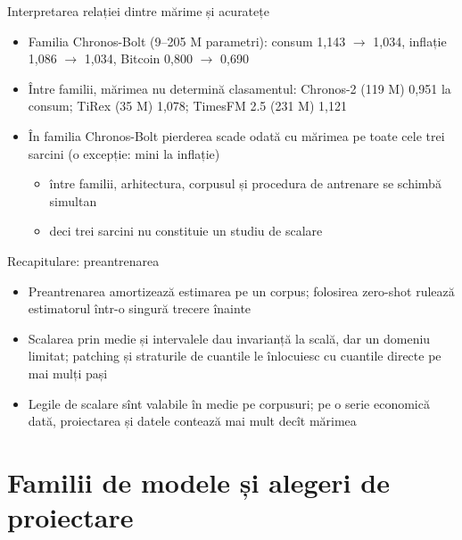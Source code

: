 \begin{frame}{Interpretarea relației dintre mărime și acuratețe}
\itemsize{\small}
\begin{itemize}
    \item Familia Chronos-Bolt (9--205 M parametri): consum 1{,}143 $\to$ 1{,}034, inflație 1{,}086 $\to$ 1{,}034, Bitcoin 0{,}800 $\to$ 0{,}690
    \item Între familii, mărimea nu determină clasamentul: Chronos-2 (119 M) 0{,}951 la consum; TiRex (35 M) 1{,}078; TimesFM 2.5 (231 M) 1{,}121
    \item În familia Chronos-Bolt pierderea scade odată cu mărimea pe toate cele trei sarcini (o excepție: mini la inflație)
    \begin{itemize}
        \item între familii, arhitectura, corpusul și procedura de antrenare se schimbă simultan
        \item deci trei sarcini nu constituie un studiu de scalare
    \end{itemize}
\end{itemize}
\end{frame}

\begin{frame}{Recapitulare: preantrenarea}
\itemsize{\small}
\begin{itemize}
    \item Preantrenarea amortizează estimarea pe un corpus; folosirea zero-shot rulează estimatorul într-o singură trecere înainte
    \item Scalarea prin medie și intervalele dau invarianță la scală, dar un domeniu limitat; patching și straturile de cuantile le înlocuiesc cu cuantile directe pe mai mulți pași
    \item Legile de scalare sînt valabile în medie pe corpusuri; pe o serie economică dată, proiectarea și datele contează mai mult decît mărimea
\end{itemize}
\end{frame}


\section{Familii de modele și alegeri de proiectare}

